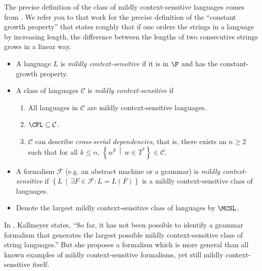 \documentclass{article}
\newcommand{\lb}{\left\{} %
\newcommand{\rb}{\right\}} %
\newcommand{\st}{\,\middle|\,} %
\begin{document}
The precise definition of the class of mildly context-sensitive languages comes from \autocite[Definition~1]{kallmeyer}.
We refer you to that work for the precise definition of the ``constant growth property'' that states roughly that if one orders the strings in a language by increasing length, the difference between the lengths of two consecutive strings grows in a linear way.
\begin{definition}\mbox{}
  \begin{itemize}
  \item A language $L$ is \emph{mildly context-sensitive} if it is in $\P$ and has the constant-growth property.
  \item A class of languages $\mathcal{C}$ is \emph{mildly context-sensitive} if
    \begin{enumerate}
    \item All languages in $\mathcal{C}$ are mildly context-sensitive languages.
    \item $\CFL\subseteq\mathcal{C}$.
    \item $\mathcal{C}$ can describe \emph{cross-serial dependencies}, that is, there exists an $n\geq 2$ such that for all $k\leq n$, $\lb w^k \st w\in T^*\rb\in\mathcal{C}$.
    \end{enumerate}
  \item A formalism $\mathcal{F}$ (e.g. an abstract machine or a grammar) is \emph{mildly context-sensitive} if $\lb L \st \exists F\in\mathcal{F}\colon L = L(F)\rb$ is a mildly context-sensitive class of languages.
  \item Denote the largest mildly context-sensitive class of languages by $\MCSL$.
  \end{itemize}
\end{definition}

In \autocite{kallmeyer}, Kallmeyer states, ``So far, it has not been possible to identify a grammar formalism that generates the largest possible mildly context-sensitive class of string languages.''
But she proposes a formalism which is more general than all known examples of mildly context-sensitive formalisms, yet still mildly context-sensitive itself.

\printbibliography
\end{document}
